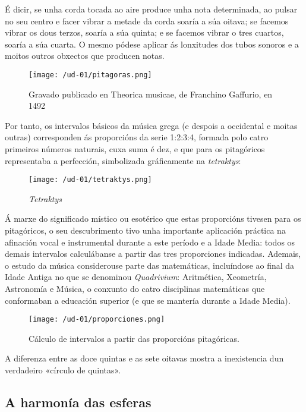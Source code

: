 É dicir, se unha corda tocada ao aire produce unha nota determinada, ao
pulsar no seu centro e facer vibrar a metade da corda soaría a súa
oitava; se facemos vibrar os dous terzos, soaría a súa quinta; e se
facemos vibrar o tres cuartos, soaría a súa cuarta. O mesmo pódese
aplicar ás lonxitudes dos tubos sonoros e a moitos outros obxectos que
producen notas.

\begin{figure}
\centering
\texttt{[image: /ud-01/pitagoras.png]}
\caption{Gravado publicado en Theorica  musicae, de Franchino Gaffurio, en 1492}
\end{figure}

Por tanto, os intervalos básicos da música grega (e despois a occidental
e moitas outras) corresponden ás proporcións da serie 1:2:3:4, formada
polo catro primeiros números naturais, cuxa suma é dez, e que para os
pitagóricos representaba a perfección, simbolizada gráficamente na
\emph{tetraktys}:

\begin{wrapfigure}{l}{0.30\textwidth}
\begin{center}
\texttt{[image: /ud-01/tetraktys.png]}
\end{center}
\caption{\emph{Tetraktys}}
\end{wrapfigure}

Á marxe do significado místico ou esotérico que estas proporcións
tivesen para os pitagóricos, o seu descubrimento tivo unha importante
aplicación práctica na afinación vocal e instrumental durante a este
período e a Idade Media: todos os demais intervalos calculábanse a
partir das tres proporciones indicadas. Ademais, o estudo da música
considerouse parte das matemáticas, incluíndose ao final da Idade Antiga
no que se denominou \emph{Quadrivium}: Aritmética, Xeometría, Astronomía
e Música, o conxunto do catro disciplinas matemáticas que conformaban a
educación superior (e que se mantería durante a Idade Media).

\begin{figure}
\centering
\texttt{[image: /ud-01/proporciones.png]}
\caption{Cálculo de intervalos a partir das proporcións pitagóricas.}
\end{figure}

A diferenza entre as doce quintas e as sete oitavas mostra a
inexistencia dun verdadeiro «círculo de quintas».


\subsection*{A harmonía das esferas}\label{a-harmonuxeda-das-esferas}

